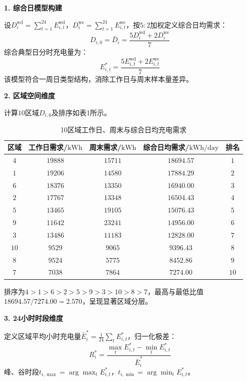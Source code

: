\documentclass[a4paper,12pt]{ctexart}
\begin{document}
\textbf{1. 综合日模型构建}

设$D_{i}^{\mathrm{wd}}=\sum_{t=1}^{24}E_{i,t}^{\mathrm{wd}}$，$D_{i}^{\mathrm{we}}=\sum_{t=1}^{24}E_{i,t}^{\mathrm{we}}$，按$5\!:\!2$加权定义综合日均需求：
\begin{equation}
D_{i,0}=\bar{D}_{i}=\frac{5D_{i}^{\mathrm{wd}}+2D_{i}^{\mathrm{we}}}{7}\tag{1-1}
\end{equation}
综合典型日分时充电量为：
\begin{equation}
E_{i,t}^{*}=\frac{5E_{i,t}^{\mathrm{wd}}+2E_{i,t}^{\mathrm{we}}}{7}\tag{1-2}
\end{equation}
该模型符合一周日类型结构，消除工作日与周末样本量差异。

\textbf{2. 区域空间维度}

计算$10$区域$D_{i,0}$及排序如表1所示。

\begin{table}[H]
\centering
\caption{10区域工作日、周末与综合日均充电需求}
\begin{tabular}{ccccc}
\toprule
区域 & 工作日需求/$\mathrm{kWh}$ & 周末需求/$\mathrm{kWh}$ & 综合日均需求/$\mathrm{kWh/day}$ & 排名 \\
\midrule
$4$ & $19888$ & $15711$ & $18694.57$ & $1$ \\
$1$ & $19206$ & $14580$ & $17884.29$ & $2$ \\
$6$ & $18376$ & $13350$ & $16940.00$ & $3$ \\
$2$ & $17767$ & $13348$ & $16504.43$ & $4$ \\
$5$ & $13465$ & $19105$ & $15076.43$ & $5$ \\
$9$ & $11642$ & $23241$ & $14956.00$ & $6$ \\
$3$ & $13486$ & $11183$ & $12828.00$ & $7$ \\
$10$ & $9529$ & $9065$ & $9396.43$ & $8$ \\
$8$ & $9524$ & $5775$ & $8452.86$ & $9$ \\
$7$ & $7038$ & $7864$ & $7274.00$ & $10$ \\
\bottomrule
\end{tabular}
\end{table}

排序为$4>1>6>2>5>9>3>10>8>7$，最高与最低比值$18694.57/7274.00=2.570$，呈现显著区域分层。


\textbf{3. 24小时时段维度}

定义区域平均小时充电量$\bar{E}_{i}^{*}=\frac{1}{24}\sum_{t}E_{i,t}^{*}$，归一化极差：
\begin{equation}
R_{i}^{*}=\frac{\max_{t}E_{i,t}^{*}-\min_{t}E_{i,t}^{*}}{\bar{E}_{i}^{*}}\tag{1-3}
\end{equation}
峰、谷时段$t_{i,\max}=\arg\max_{t}E_{i,t}^{*}$，$t_{i,\min}=\arg\min_{t}E_{i,t}^{*}$。
\end{document}
